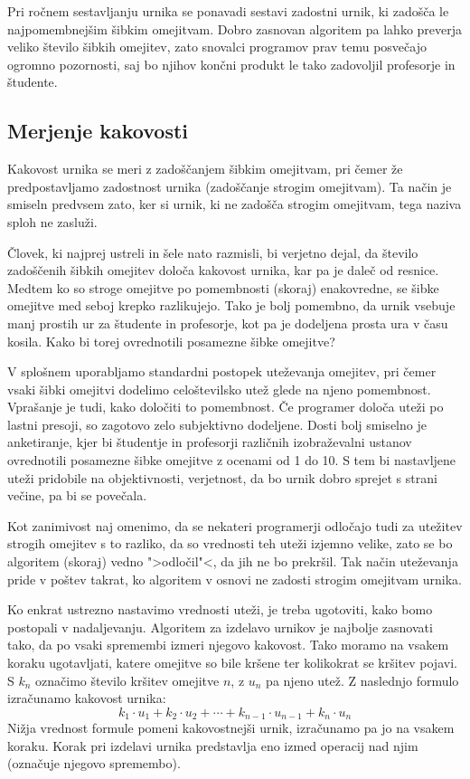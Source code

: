 \documentclass[10pt, a4paper]{article}
\begin{document}
Pri ročnem sestavljanju urnika se ponavadi sestavi zadostni urnik, ki zadošča le
najpomembnejšim šibkim omejitvam. Dobro zasnovan algoritem pa lahko preverja veliko
število šibkih omejitev, zato snovalci programov prav temu posvečajo ogromno pozornosti,
saj bo njihov končni produkt le tako zadovoljil profesorje in študente.

\subsection{Merjenje kakovosti}

Kakovost urnika se meri z zadoščanjem šibkim omejitvam, pri čemer že predpostavljamo
zadostnost urnika (zadoščanje strogim omejitvam). Ta način je smiseln predvsem zato,
ker si urnik, ki ne zadošča strogim omejitvam, tega naziva sploh ne zasluži.

Človek, ki najprej ustreli in šele nato razmisli, bi verjetno dejal, da število
zadoščenih šibkih omejitev določa kakovost urnika, kar pa je daleč od resnice. Medtem
ko so stroge omejitve po pomembnosti (skoraj) enakovredne, se šibke omejitve med seboj
krepko razlikujejo. Tako je bolj pomembno, da urnik vsebuje manj prostih ur za
študente in profesorje, kot pa je dodeljena prosta ura v času kosila. Kako bi torej
ovrednotili posamezne šibke omejitve?

V splošnem uporabljamo standardni postopek uteževanja omejitev, pri čemer vsaki šibki
omejitvi dodelimo celoštevilsko utež glede na njeno pomembnost. Vprašanje je tudi, kako
določiti to pomembnost. Če programer določa uteži po lastni presoji, so zagotovo zelo
subjektivno dodeljene. Dosti bolj smiselno je anketiranje, kjer bi študentje in profesorji
različnih izobraževalni ustanov ovrednotili posamezne šibke omejitve z ocenami od 1 do 10.
S tem bi nastavljene uteži pridobile na objektivnosti, verjetnost, da bo urnik dobro
sprejet s strani večine, pa bi se povečala.

Kot zanimivost naj omenimo, da se nekateri programerji odločajo tudi za utežitev strogih
omejitev s to razliko, da so vrednosti teh uteži izjemno velike, zato se bo algoritem
(skoraj) vedno  ">odločil"<, da jih ne bo prekršil. Tak način uteževanja pride v poštev
takrat, ko algoritem v osnovi ne zadosti strogim omejitvam urnika.

Ko enkrat ustrezno nastavimo vrednosti uteži, je treba ugotoviti, kako bomo postopali
v nadaljevanju. Algoritem za izdelavo urnikov je najbolje zasnovati tako, da po vsaki
spremembi izmeri njegovo kakovost. Tako moramo na vsakem koraku ugotavljati, katere
omejitve so bile kršene ter kolikokrat se kršitev pojavi. S $k_n$ označimo število
kršitev omejitve $n$, z $u_n$ pa njeno utež. Z naslednjo formulo izračunamo
kakovost urnika:
\[k_1\cdot u_1 + k_2 \cdot u_2 + \cdots + k_{n-1}\cdot u_{n-1} + k_n\cdot u_n\]
Nižja vrednost formule pomeni kakovostnejši urnik, izračunamo pa jo na vsakem koraku.
Korak pri izdelavi urnika predstavlja eno izmed operacij nad njim (označuje njegovo
spremembo).
\end{document}
